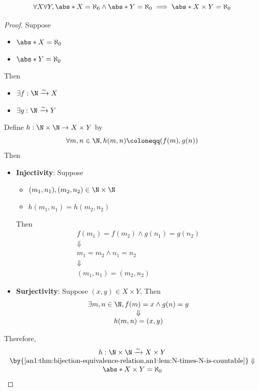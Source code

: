 \begin{theorem} \label{an1:thm:product-of-two-countable-sets-is-countable}
  \[
    \forall X \forall Y, \abs*{X} = \aleph_{0} \land \abs*{Y} = \aleph_{0}
    \implies \abs*{X \times Y} = \aleph_{0}
  \]
\end{theorem}

\begin{proof}
  Suppose
  \begin{itemize}
    \item $\abs*{X} = \aleph_{0}$
    \item $\abs*{Y} = \aleph_{0}$
  \end{itemize}
  Then
  \begin{itemize}
    \item $\exists f: \N \xrightarrow{\sim} X$
    \item $\exists g: \N \xrightarrow{\sim} Y$
  \end{itemize}
  Define $h: \N \times \N \to X \times Y$ by
  \[
    \forall m, n \in \N, h(m, n) \coloneqq (f(m), g(n))
  \]
  Then
  \begin{itemize}
    \item \textbf{Injectivity}: Suppose
          \begin{itemize}
            \item $(m_{1}, n_{1}), (m_{2}, n_{2}) \in \N \times \N$
            \item $h(m_{1}, n_{1}) = h(m_{2}, n_{2})$
          \end{itemize}
          Then
          \[
            \begin{array}{c}
              f(m_{1}) = f(m_{2}) \land g(n_{1}) = g(n_{2}) \\
              \Downarrow                                    \\
              m_{1} = m_{2} \land n_{1} = n_{2}             \\
              \Downarrow                                    \\
              (m_{1}, n_{1}) = (m_{2}, n_{2})
            \end{array}
          \]
    \item \textbf{Surjectivity}: Suppose $(x, y) \in X \times Y$. Then
          \[
            \begin{array}{c}
              \exists m, n \in \N, f(m) = x \land g(n) = y \\
              \Downarrow                                   \\
              h(m, n) = (x, y)
            \end{array}
          \]
  \end{itemize}
  Therefore,
  \[
    \begin{array}{c}
      h: \N \times \N \xrightarrow{\sim} X \times Y                                                \\
      \by{\Cref{an1:thm:bijection-equivalence-relation,an1:lem:N-times-N-is-countable}} \Downarrow \\
      \abs*{X \times Y} = \aleph_{0}
    \end{array}
  \]
\end{proof}


